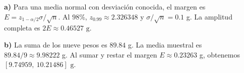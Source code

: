 \textbf{a)} Para una media normal con desviación conocida,
el margen es $E=z_{1-\alpha/2}\sigma/\sqrt n$.
Al $98\%$, $z_{0.99}\approx2.326348$ y $\sigma/\sqrt n=0.1$ g.
La amplitud completa es $2E\approx\boxed{0.46527\text{ g}}$.

\textbf{b)} La suma de los nueve pesos es $89.84$ g.
La media muestral es $89.84/9\approx9.98222$ g.
Al sumar y restar el margen $E\approx0.23263$ g,
obtenemos $\boxed{[9.74959,\ 10.21486]\text{ g}}$.
